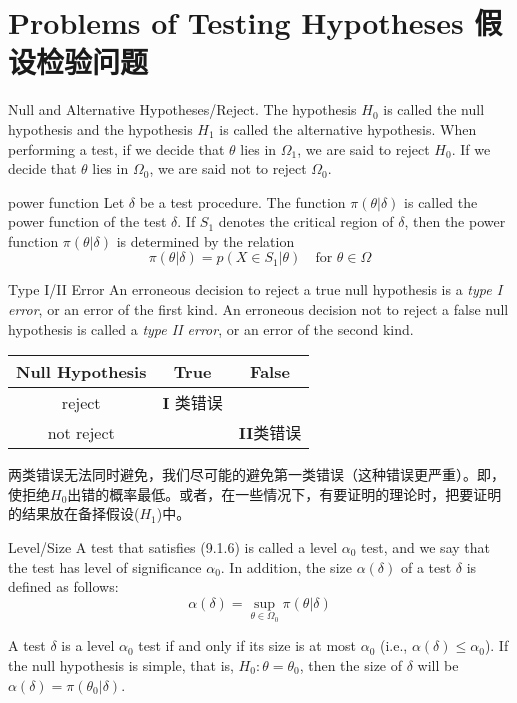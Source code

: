\documentclass[../main.tex]{subfiles}
\begin{document}
\section{Problems of Testing Hypotheses 假设检验问题}
\begin{definition}{Null and Alternative Hypotheses/Reject.}{}
The hypothesis $H_0$ is called the null hypothesis and the hypothesis $H_1$ is called the alternative hypothesis. When performing a test, if
we decide that $\theta$ lies in $\Omega_1$, we are said to reject $H_0$. If we decide that $\theta$ lies in $\Omega_0$, we are said not to reject $\Omega_0$.
\end{definition}


\begin{definition}{power function}{}
Let $\delta$ be a test procedure. The function $\pi(\theta|\delta)$ is called the power function of the test $\delta$. If $S_1$ denotes the critical region of $\delta$, then the power function $\pi(\theta|\delta)$ is determined by the relation
\begin{equation}\label{}
\pi(\theta|\delta)=p(X\in S_1| \theta) \quad\text{for $\theta \in \Omega$}
\end{equation}
\end{definition}

\begin{definition}{Type I/II Error}{}
An erroneous decision to reject a true null hypothesis is a \textit{type I error},
or an error of the ﬁrst kind. An erroneous decision not to reject a false null hypothesis is called a \textit{type II error}, or an error of the second kind.
\begin{center}
\begin{tabular}[H]{|c|c|c|}
\hline
Null Hypothesis & True & False \\
\hline
reject & \textbf{I} 类错误 &  \\
\hline
not reject &  &\textbf{II}类错误 \\
\hline
\end{tabular}
\end{center}
\end{definition}

两类错误无法同时避免，我们尽可能的避免第一类错误（这种错误更严重）。即，使拒绝$H_0$出错的概率最低。或者，在一些情况下，有要证明的理论时，把要证明的结果放在备择假设($H_1$)中。


\begin{definition}{Level/Size}{}
A test that satisﬁes (9.1.6) is called a level $\alpha_0$ test, and we say that the test
has level of signiﬁcance $\alpha_0$. In addition, the size $\alpha(\delta)$ of a test $\delta$ is deﬁned as follows:
\begin{equation}\label{}
\alpha(\delta)=\sup\limits_{\theta\in\Omega_0} \pi(\theta|\delta)
\end{equation}
\end{definition}

\begin{corollary}{}{}
A test $\delta$ is a level $\alpha_0$ test if and only if its size is at most $\alpha_0$ (i.e., $\alpha(\delta) \leqslant \alpha_0$). If the null hypothesis is simple, that is, $H_0:\theta = \theta_0$, then the size of $\delta$ will be $\alpha(\delta)=\pi(\theta_0|\delta)$.
\end{corollary}
\end{document}
